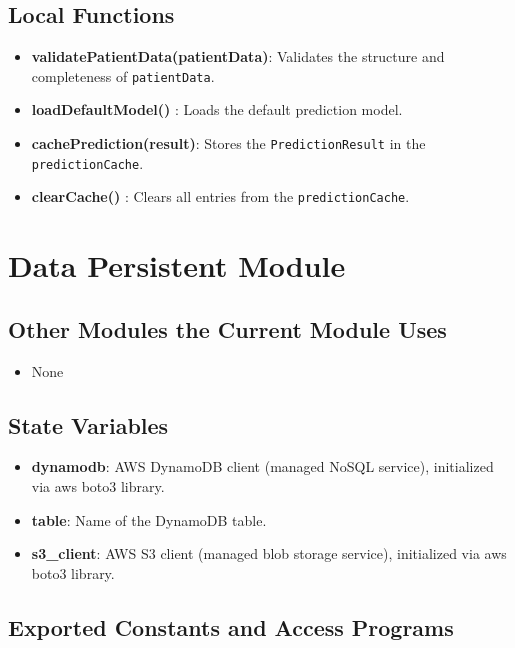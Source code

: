 \documentclass[12pt, titlepage]{article}
\begin{document}
\subsection{Local Functions}
\begin{itemize}
    \item \textbf{validatePatientData(patientData)}: Validates the structure and completeness of \texttt{patientData}.
    \item \textbf{loadDefaultModel()} : Loads the default prediction model.
    \item \textbf{cachePrediction(result)}: Stores the \texttt{PredictionResult} in the \texttt{predictionCache}.
    \item \textbf{clearCache()} : Clears all entries from the \texttt{predictionCache}.
\end{itemize}

\section{Data Persistent Module}

\subsection{Other Modules the Current Module Uses}
\begin{itemize}
    \item None
\end{itemize}

\subsection{State Variables}
\begin{itemize}
    \item \textbf{dynamodb}: AWS DynamoDB client (managed NoSQL service), initialized via aws boto3 library.
    \item \textbf{table}: Name of the DynamoDB table.
    \item \textbf{s3\_client}: AWS S3 client (managed blob storage service), initialized via aws boto3 library.
\end{itemize}

\subsection{Exported Constants and Access Programs}
\end{document}
